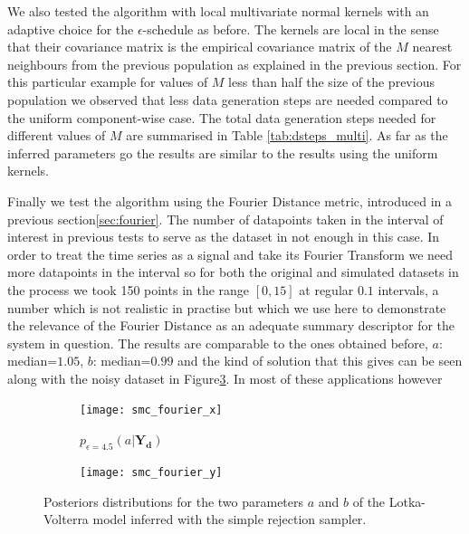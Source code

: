 We also tested the algorithm with local multivariate normal kernels with an adaptive choice for the $\epsilon$-schedule as before.  The kernels are local in the sense that their covariance matrix is the empirical covariance matrix of the $M$ nearest neighbours from the previous population as explained in the previous section. For this particular example for values of $M $ less than half the size of the previous population we observed that less data generation steps are needed compared to the uniform component-wise case. The total data generation steps needed for different values of $M$ are summarised in Table \ref{tab:dsteps_multi}. As far as the inferred parameters go the results are similar to the results using the uniform kernels.

Finally we test the algorithm using the Fourier Distance metric, introduced in a previous section\ref{sec:fourier}. The number of datapoints taken in the interval of interest in previous tests to serve as the dataset in not enough in this case. In order to treat the time series as a signal and take its Fourier Transform we need more datapoints in the interval so for both the original and simulated datasets in the process we took 150 points in the range $[0, 15]$ at regular $0.1$ intervals, a number which is not realistic in practise but which we use here to demonstrate the relevance of the Fourier Distance as an adequate summary descriptor for the system in question. The results are comparable to the ones obtained before, $a$: median=$1.05$, $b$: median=$0.99$ and the kind of solution that this gives can be seen along with the noisy dataset in Figure\ref{fig:four_solution}. In most of these applications however

\begin{figure}
\centering
\begin{subfigure}{.5\textwidth}
  \centering
  \texttt{[image: smc\_fourier\_x]}
  \caption{$p_{\epsilon=4.5}(a|\mathbf{Y_d})$}
  \label{fig:sub1}
\end{subfigure}%
\begin{subfigure}{.5\textwidth}
  \centering
  \texttt{[image: smc\_fourier\_y]}
  \caption{}
  \label{fig:sub2}
\end{subfigure}
\caption{Posteriors distributions for the two parameters $a$ and $b$ of the Lotka-Volterra model inferred with the simple rejection sampler.}
\label{fig:four_solution}
\end{figure}



